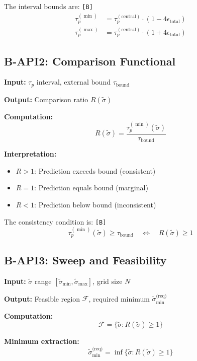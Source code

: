 \documentclass[11pt,a4paper]{article}
\newcommand{\tagB}{\textcolor{purple!70!black}{\texttt{[B]}}}
\theoremstyle{definition}
\begin{document}
The interval bounds are: \tagB{}
\begin{align}
\label{eq:tau-min}
\tau_p^{(\min)} &= \tau_p^{(\text{central})} \cdot (1 - 4\epsilon_{\text{total}}) \\
\label{eq:tau-max}
\tau_p^{(\max)} &= \tau_p^{(\text{central})} \cdot (1 + 4\epsilon_{\text{total}})
\end{align}

\subsection{B-API2: Comparison Functional}
\label{subsec:b-api2}

\begin{apibox}
\textbf{Input:} $\tau_p$ interval, external bound $\tau_{\text{bound}}$

\textbf{Output:} Comparison ratio $R(\tilde{\sigma})$

\textbf{Computation:}
\begin{equation}
\label{eq:b-api2-ratio}
R(\tilde{\sigma}) = \frac{\tau_p^{(\min)}(\tilde{\sigma})}{\tau_{\text{bound}}}
\end{equation}

\textbf{Interpretation:}
\begin{itemize}
  \item $R > 1$: Prediction exceeds bound (consistent)
  \item $R = 1$: Prediction equals bound (marginal)
  \item $R < 1$: Prediction below bound (inconsistent)
\end{itemize}
\end{apibox}

The consistency condition is: \tagB{}
\begin{equation}
\label{eq:consistency-condition}
\tau_p^{(\min)}(\tilde{\sigma}) \geq \tau_{\text{bound}} \quad \Leftrightarrow \quad R(\tilde{\sigma}) \geq 1
\end{equation}

\subsection{B-API3: Sweep and Feasibility}
\label{subsec:b-api3}

\begin{apibox}
\textbf{Input:} $\tilde{\sigma}$ range $[\tilde{\sigma}_{\min}, \tilde{\sigma}_{\max}]$, grid size $N$

\textbf{Output:} Feasible region $\mathcal{F}$, required minimum $\tilde{\sigma}_{\min}^{\text{(req)}}$

\textbf{Computation:}
\begin{equation}
\label{eq:b-api3-sweep}
\mathcal{F} = \{\tilde{\sigma} : R(\tilde{\sigma}) \geq 1\}
\end{equation}

\textbf{Minimum extraction:}
\begin{equation}
\label{eq:sigma-min-req}
\tilde{\sigma}_{\min}^{\text{(req)}} = \inf\{\tilde{\sigma} : R(\tilde{\sigma}) \geq 1\}
\end{equation}
\end{apibox}
\end{document}
